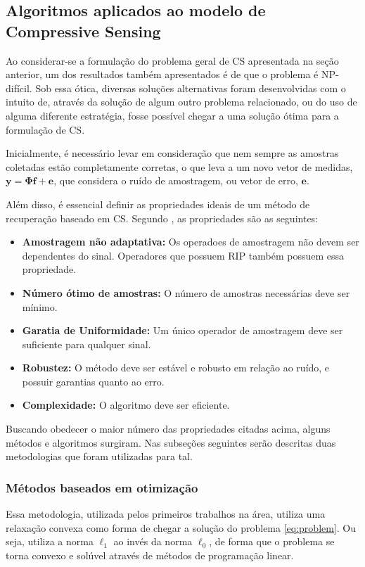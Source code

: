 \documentclass[cic,tc]{iiufrgs}
\renewcommand{\vec}[1]{\bm{#1}}
\begin{document}
\subsection{Algoritmos aplicados ao modelo de Compressive Sensing}
\label{sec:csalgo}
Ao considerar-se a formulação do problema geral de CS apresentada na seção anterior, um dos resultados também apresentados
é de que o problema é NP-difícil. Sob essa ótica, diversas soluções alternativas foram desenvolvidas com 
o intuito de, através da solução de algum outro problema relacionado, ou do uso de alguma diferente estratégia, fosse possível 
chegar a uma solução ótima para a formulação de CS. 

Inicialmente, é necessário levar em consideração que nem sempre as amostras coletadas estão completamente corretas,
o que leva a um novo vetor de medidas, $\vec{y} = \mathbf{\Phi} \vec{f} + \vec{e}$, que considera o ruído de amostragem, 
ou vetor de erro, $\vec{e}$.

Além disso, é essencial definir as propriedades ideais de um método de recuperação
baseado em CS. Segundo \citet{chen2015compressed}, as propriedades são as seguintes:
\begin{itemize}
    \item \textbf{Amostragem não adaptativa:} Os operadoes de amostragem não devem ser dependentes do sinal. 
          Operadores que possuem RIP também possuem essa propriedade.
    \item \textbf{Número ótimo de amostras:} O número de amostras necessárias deve ser mínimo.
    \item \textbf{Garatia de Uniformidade:} Um único operador de amostragem deve ser suficiente para qualquer sinal.
    \item \textbf{Robustez:} O método deve ser estável e robusto em relação ao ruído, e possuir garantias 
          quanto ao erro.
    \item \textbf{Complexidade:} O algoritmo deve ser eficiente.
\end{itemize}

Buscando obedecer o maior número das propriedades citadas acima, alguns métodos e algoritmos surgiram. 
Nas subseções seguintes serão descritas duas metodologias que foram utilizadas para tal.

\subsubsection{Métodos baseados em otimização}
Essa metodologia, utilizada pelos primeiros trabalhos na área, utiliza uma relaxação convexa como forma
de chegar a solução do problema \eqref{eq:problem}. Ou seja, utiliza a norma $\ell_1$ ao invés da norma $\ell_0$,
de forma que o problema se torna convexo e solúvel através de métodos de programação linear.
\end{document}
